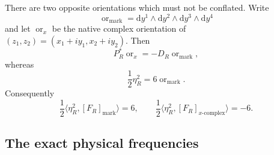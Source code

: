 There are two opposite orientations which must not be conflated.  Write
\begin{equation}
 \operatorname{or}_{\mathrm{mark}}
 =\mathrm dy^1\wedge\mathrm dy^2\wedge
  \mathrm dy^3\wedge\mathrm dy^4
 \label{cusp-native-full-flux-marking-orientation}
\end{equation}
and let \(\operatorname{or}_{x}\) be the native complex orientation of
\((z_1,z_2)=(x_1+iy_1,x_2+iy_2)\).  Then
\begin{equation}
 P_R^*\operatorname{or}_{x}
 =-D_R\operatorname{or}_{\mathrm{mark}},
 \label{cusp-native-full-flux-orientation-reversal}
\end{equation}
whereas
\begin{equation}
 \frac12\eta_R^2=6\operatorname{or}_{\mathrm{mark}}.
 \label{cusp-native-full-flux-square}
\end{equation}
Consequently
\begin{equation}
 \frac12\langle\eta_R^2,[F_R]_{\mathrm{mark}}\rangle=6,
 \qquad
 \frac12\langle\eta_R^2,[F_R]_{x\text{-}\mathrm{complex}}\rangle=-6.
 \label{cusp-native-full-flux-two-orientation-pairings}
\end{equation}

\subsection{The exact physical frequencies}

